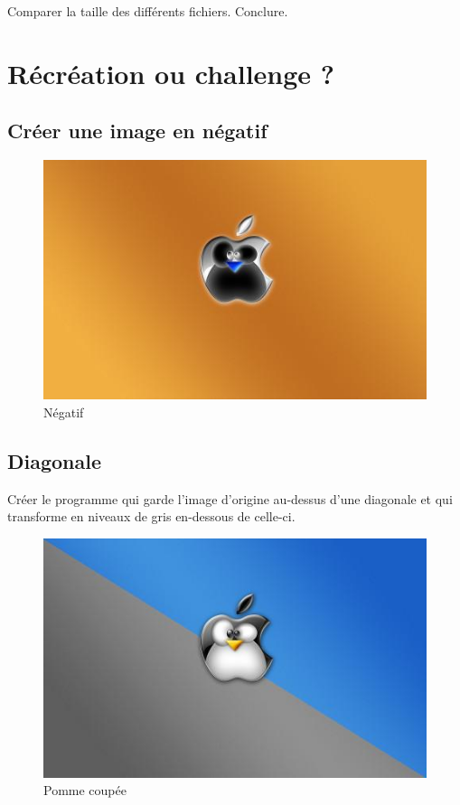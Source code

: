 \documentclass[11pt]{article}
\begin{document}
Comparer la taille des différents fichiers. Conclure.


\section{Récréation ou challenge ?}
\label{sec:org7896b85}

\subsection{Créer une image en négatif}
\label{sec:org9018a77}

\begin{figure}[htbp]
\centering
\includegraphics[width=.9\linewidth]{pommeNegatif.jpg}
\caption{Négatif}
\end{figure}

\subsection{Diagonale}
\label{sec:org1031e6d}

Créer le programme qui garde l'image d'origine au-dessus d'une diagonale et qui transforme en niveaux de gris en-dessous de celle-ci.


\begin{figure}[htbp]
\centering
\includegraphics[width=.9\linewidth]{pommemisgrise.jpg}
\caption{Pomme coupée}
\end{figure}
\end{document}

